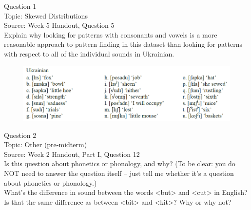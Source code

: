 \documentclass[12pt]{article}
\begin{document}
\begin{center}
\textbf{{\color{blue}{\HUGE START OF EXAM\\}}}

\textbf{{\color{blue}{\HUGE Student ID: 36593\\}}}

\textbf{{\color{blue}{\HUGE 4:50\\}}}

\end{center}
\newpage

{\large Question 1}\\

Topic: Skewed Distributions\\
Source: Week 5 Handout, Question 5\\

Explain why looking for patterns with consonants and vowels is a more reasonable approach to pattern finding in this dataset than looking for patterns with respect to all of the individual sounds in Ukrainian.\\

\begin{figure}[H]
\includegraphics{../images/ukrainian.png}
\end{figure}

\newpage

{\large Question 2}\\

Topic: Other (pre-midterm)\\
Source: Week 2 Handout, Part I, Question 12\\

Is this question about phonetics or phonology, and why? (To be clear: you do NOT need to answer the question itself -- just tell me whether it's a question about phonetics or phonology.)\\

What’s the difference in sound between the words <but> and <cut> in English? Is that the same difference as between <bit> and <kit>? Why or why not?


\newpage

\begin{center}
\textbf{{\color{red}{\HUGE END OF EXAM}}}\\

\end{center}
\newpage
\end{document}
